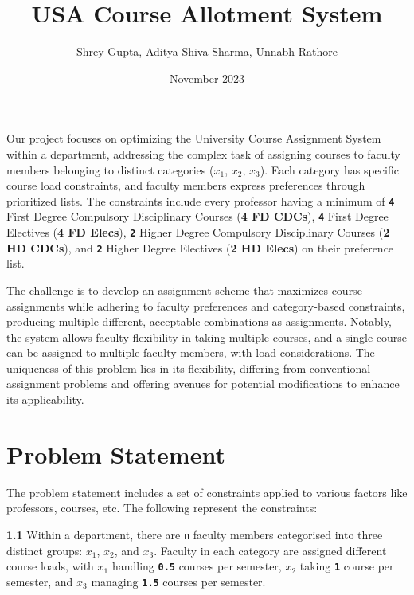 \documentclass{article}
\title{USA Course Allotment System}
\author{Shrey Gupta, Aditya Shiva Sharma, Unnabh Rathore}
\date{November 2023}
\begin{document}
\maketitle
Our project focuses on optimizing the University Course Assignment System within a department, addressing the complex task of assigning courses to faculty members belonging to distinct categories (\texttt{$x_1$}, \texttt{$x_2$}, \texttt{$x_3$}). Each category has specific course load constraints, and faculty members express preferences through prioritized lists. The constraints include every professor having a minimum of \texttt{\textbf{4}} First Degree Compulsory Disciplinary Courses (\textbf{4 FD CDCs}), \texttt{\textbf{4}} First Degree Electives (\textbf{4 FD Elecs}), \texttt{\textbf{2}} Higher Degree Compulsory Disciplinary Courses (\textbf{2 HD CDCs}), and \texttt{\textbf{2}} Higher Degree Electives (\textbf{2 HD Elecs}) on their preference list.

\bigskip

The challenge is to develop an assignment scheme that maximizes course assignments while adhering to faculty preferences and category-based constraints, producing multiple different, acceptable combinations as assignments. Notably, the system allows faculty flexibility in taking multiple courses, and a single course can be assigned to multiple faculty members, with load considerations. The uniqueness of this problem lies in its flexibility, differing from conventional assignment problems and offering avenues for potential modifications to enhance its applicability.

\section{Problem Statement}

The problem statement includes a set of constraints applied to various factors like professors, courses, etc. The following represent the constraints:

        \bigskip

        \textbf{1.1} Within a department, there are \texttt{n} faculty members categorised into three distinct groups: \texttt{$x_1$}, \texttt{$x_2$}, and \texttt{$x_3$}. Faculty in each category are assigned different course loads, with \texttt{$x_1$} handling \texttt{\textbf{0.5}} courses per semester, \texttt{$x_2$} taking \texttt{\textbf{1}} course per semester, and \texttt{$x_3$} managing \texttt{\textbf{1.5}} courses per semester.

        \bigskip
        
\end{document}
